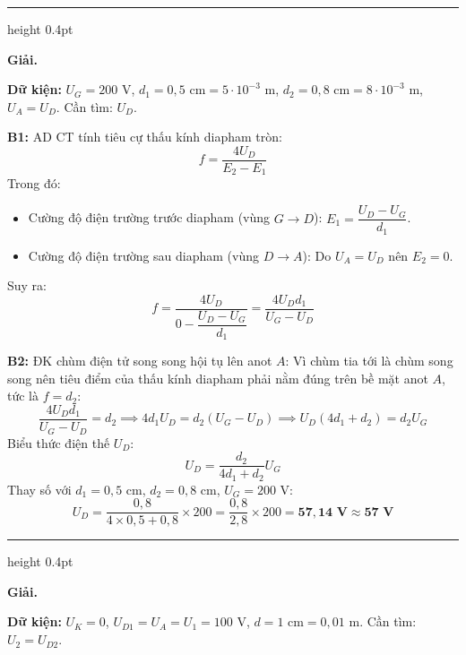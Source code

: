 \documentclass[11pt,a4paper]{article}
\renewcommand{\boldsymbol}[1]{\symbf{#1}}
\let\DeBaiOriginal\DeBai
\renewcommand{\DeBai}[1]{\par\Needspace{5\baselineskip}\DeBaiOriginal{#1}}
\newcommand{\PhanCachBai}{%
  \par\Needspace{7\baselineskip}%
  \addvspace{6pt}%
  {\color{black!40}\hrule height 0.4pt}%
  \nobreak\vspace{7pt}\nobreak
}
\begin{document}
\PhanCachBai


\textbf{Giải.}

\textbf{Dữ kiện:} $U_G = 200\text{ V}$, $d_1 = 0{,}5\text{ cm} = 5 \cdot 10^{-3}\text{ m}$, $d_2 = 0{,}8\text{ cm} = 8 \cdot 10^{-3}\text{ m}$, $U_A = U_D$. Cần tìm: $U_D$.

\textbf{B1:} AD CT tính tiêu cự thấu kính diapham tròn:
\begin{equation*}
    f = \frac{4 U_D}{E_2 - E_1}
\end{equation*}
Trong đó:
\begin{itemize}[leftmargin=*, topsep=1pt, itemsep=1pt]
  \item Cường độ điện trường trước diapham (vùng $G \to D$): $E_1 = \dfrac{U_D - U_G}{d_1}$.
  \item Cường độ điện trường sau diapham (vùng $D \to A$): Do $U_A = U_D$ nên $E_2 = 0$.
\end{itemize}
Suy ra:
\begin{equation*}
    f = \frac{4 U_D}{0 - \dfrac{U_D - U_G}{d_1}} = \frac{4 U_D d_1}{U_G - U_D}
\end{equation*}

\textbf{B2:} ĐK chùm điện tử song song hội tụ lên anot $A$:
Vì chùm tia tới là chùm song song nên tiêu điểm của thấu kính diapham phải nằm đúng trên bề mặt anot $A$, tức là $f = d_2$:
\begin{equation*}
    \frac{4 U_D d_1}{U_G - U_D} = d_2 \implies 4 d_1 U_D = d_2(U_G - U_D) \implies U_D (4 d_1 + d_2) = d_2 U_G
\end{equation*}
Biểu thức điện thế $U_D$:
\begin{equation*}
    U_D = \frac{d_2}{4 d_1 + d_2} U_G
\end{equation*}
Thay số với $d_1 = 0{,}5\text{ cm}$, $d_2 = 0{,}8\text{ cm}$, $U_G = 200\text{ V}$:
\begin{equation*}
    U_D = \frac{0{,}8}{4 \times 0{,}5 + 0{,}8} \times 200 = \frac{0{,}8}{2{,}8} \times 200 = \boldsymbol{57{,}14\text{ V}} \approx \boldsymbol{57\text{ V}}
\end{equation*}

\PhanCachBai


\textbf{Giải.}

\textbf{Dữ kiện:} $U_K = 0$, $U_{D1} = U_A = U_1 = 100\text{ V}$, $d = 1\text{ cm} = 0{,}01\text{ m}$. Cần tìm: $U_2 = U_{D2}$.
\end{document}
